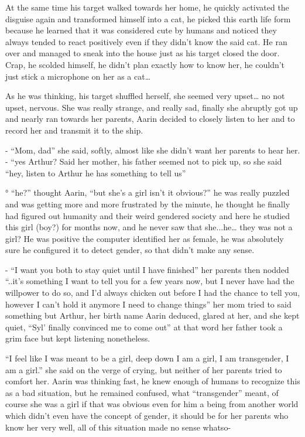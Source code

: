 \documentclass[colorlinks,12pt,a4paper]{book}
\begin{document}
At the same time his target walked towards her home, he quickly activated the disguise again and transformed 
himself into a cat, he picked this earth life form because he learned that it was considered cute by humans and 
noticed they always tended to react positively even if they didn't know the said cat. He ran over and managed to 
sneak into the house just as his target closed the door. Crap, he scolded himself, he didn't plan exactly how to 
know her, he couldn't just stick a microphone on her as a cat… \par
\bigskip

As he was thinking, his target shuffled herself, she seemed very upset… no not upset, nervous. 
She was really strange, and really sad, finally she abruptly got up and nearly ran towards her parents, 
Aarin decided to closely listen to her and to record her and transmit it to the ship.\par
\bigskip

- “Mom, dad” she said, softly, almost like she didn't want her parents to hear her.\newline
- “yes Arthur? Said her mother, his father seemed not to pick up, so she said
 “hey, listen to Arthur he has something to tell us”\newline

° “he?” thought Aarin, “but she's a girl isn't it obvious?” 
he was really puzzled and was getting more and more frustrated by the minute, 
he thought he finally had figured out humanity and their weird gendered society and 
here he studied this girl (boy?) for months now, and he never saw that she...he… 
they was not a girl? He was positive the computer identified her as female, he was absolutely sure 
he configured it to detect gender, so that didn't make any sense.\par
\bigskip

- “I want you both to stay quiet until I have finished” her parents then nodded 
“..it's something I want to tell you for a few years now, but I never have had the willpower to do so, 
and I'd always chicken out before I had the chance to tell you, however I can't hold it anymore I need to change things” 
her mom tried to said something but Arthur, her birth name Aarin deduced, glared at her, and she kept quiet, 
“Syl' finally convinced me to come out” at that word her father took a grim face but kept listening nonetheless.\newline

“I feel like I was meant to be a girl, deep down I am a girl, I am transgender, I am a girl.” she said on the verge of crying,
 but neither of her parents tried to comfort her. Aarin was thinking fast, 
 he knew enough of humans to recognize this as a bad situation, but he remained confused, what
  “transgender” meant, of course she was a girl if that was obvious even for him a being from another world which 
  didn't even have the concept of gender, it should be for her parents who know her very well, all of this situation 
  made no sense whatso-\par
  \bigskip
\end{document}
